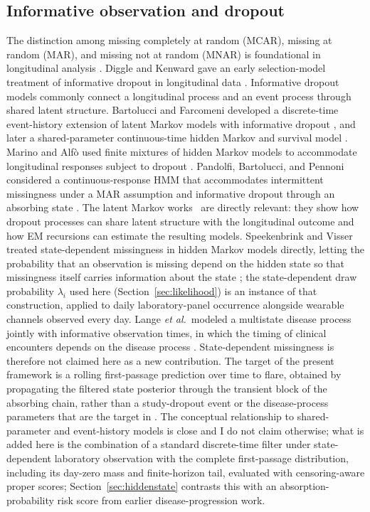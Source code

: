 \documentclass{ieeeaccess}
\begin{document}
\subsection{Informative observation and dropout}
The distinction among missing completely at random (MCAR), missing at random (MAR), and missing not at random (MNAR) is foundational in longitudinal analysis \cite{little_rubin,daniels_hogan}. Diggle and Kenward gave an early selection-model treatment of informative dropout in longitudinal data \cite{diggle}. Informative dropout models commonly connect a longitudinal process and an event process through shared latent structure. Bartolucci and Farcomeni developed a discrete-time event-history extension of latent Markov models with informative dropout \cite{bartolucci2015}, and later a shared-parameter continuous-time hidden Markov and survival model \cite{bartolucci2019}. Marino and Alf\`o used finite mixtures of hidden Markov models to accommodate longitudinal responses subject to dropout \cite{marino2020}. Pandolfi, Bartolucci, and Pennoni considered a continuous-response HMM that accommodates intermittent missingness under a MAR assumption and informative dropout through an absorbing state \cite{pandolfi2023}. The latent Markov works~\cite{bartolucci2015,bartolucci2019,marino2020,pandolfi2023} are directly relevant: they show how dropout processes can share latent structure with the longitudinal outcome and how EM recursions can estimate the resulting models. Speekenbrink and Visser treated state-dependent missingness in hidden Markov models directly, letting the probability that an observation is missing depend on the hidden state so that missingness itself carries information about the state \cite{speekenbrink2025}; the state-dependent draw probability $\lambda_i$ used here (Section~\ref{sec:likelihood}) is an instance of that construction, applied to daily laboratory-panel occurrence alongside wearable channels observed every day. Lange \emph{et al.}\ modeled a multistate disease process jointly with informative observation times, in which the timing of clinical encounters depends on the disease process \cite{lange2015}. State-dependent missingness is therefore not claimed here as a new contribution. The target of the present framework is a rolling first-passage prediction over time to flare, obtained by propagating the filtered state posterior through the transient block of the absorbing chain, rather than a study-dropout event or the disease-process parameters that are the target in \cite{lange2015}. The conceptual relationship to shared-parameter and event-history models is close and I do not claim otherwise; what is added here is the combination of a standard discrete-time filter under state-dependent laboratory observation with the complete first-passage distribution, including its day-zero mass and finite-horizon tail, evaluated with censoring-aware proper scores; Section~\ref{sec:hiddenstate} contrasts this with an absorption-probability risk score from earlier disease-progression work.
\end{document}
